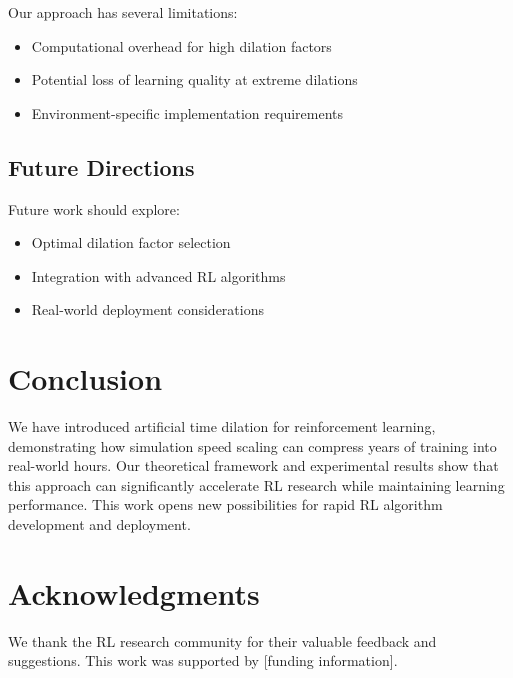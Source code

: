 \documentclass[11pt,twocolumn]{article}
\begin{document}
Our approach has several limitations:
\begin{itemize}
    \item Computational overhead for high dilation factors
    \item Potential loss of learning quality at extreme dilations
    \item Environment-specific implementation requirements
\end{itemize}

\subsection{Future Directions}

Future work should explore:
\begin{itemize}
    \item Optimal dilation factor selection
    \item Integration with advanced RL algorithms
    \item Real-world deployment considerations
\end{itemize}

\section{Conclusion}

We have introduced artificial time dilation for reinforcement learning, demonstrating how simulation speed scaling can compress years of training into real-world hours. Our theoretical framework and experimental results show that this approach can significantly accelerate RL research while maintaining learning performance. This work opens new possibilities for rapid RL algorithm development and deployment.

\section*{Acknowledgments}

We thank the RL research community for their valuable feedback and suggestions. This work was supported by [funding information].



\end{document}
